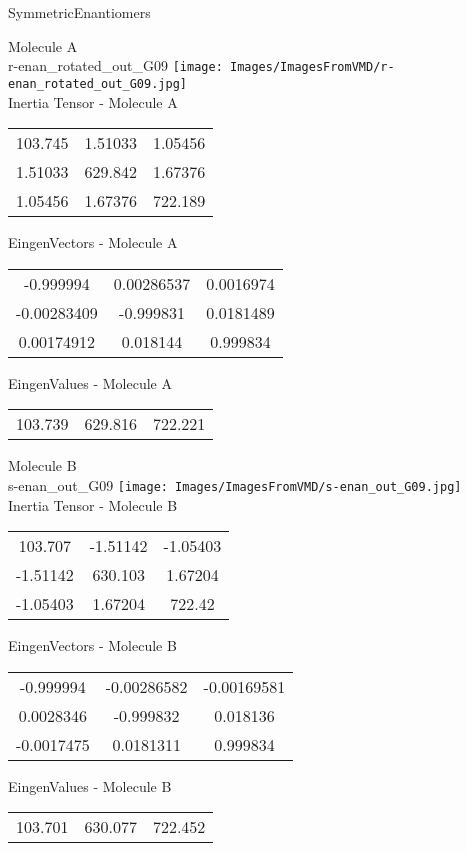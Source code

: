 \vtab[-2cm]
\begin{center}
{\large SymmetricEnantiomers}
\end{center}
\begin{multicols}{2}
\begin{center}
Molecule A \\ 
r-enan\_rotated\_out\_G09
\texttt{[image: Images/ImagesFromVMD/r-enan\_rotated\_out\_G09.jpg]}
\\
Inertia Tensor - Molecule A \\
\vtab
\begin{tabular}{|c c c|}
103.745	 & 	1.51033	 & 	1.05456	 \\
1.51033	 & 	629.842	 & 	1.67376	 \\
1.05456	 & 	1.67376	 & 	722.189
\end{tabular}

\vtab
 EingenVectors - Molecule A     \\
\vtab
\begin{tabular}{|c c c|}
-0.999994	 & 	0.00286537	 & 	0.0016974	 \\
-0.00283409	 & 	-0.999831	 & 	0.0181489	 \\
0.00174912	 & 	0.018144	 & 	0.999834
\end{tabular}

\vtab
 EingenValues - Molecule A     \\
\vtab
\begin{tabular}{|c c c|}
103.739	 & 	629.816	 & 	722.221
\end{tabular}
\columnbreak

Molecule B \\ 
s-enan\_out\_G09
\texttt{[image: Images/ImagesFromVMD/s-enan\_out\_G09.jpg]}
\\
Inertia Tensor - Molecule B \\
\vtab
\begin{tabular}{|c c c|}
103.707	 & 	-1.51142	 & 	-1.05403	 \\
-1.51142	 & 	630.103	 & 	1.67204	 \\
-1.05403	 & 	1.67204	 & 	722.42
\end{tabular}

\vtab
 EingenVectors - Molecule B     \\
\vtab
\begin{tabular}{|c c c|}
-0.999994	 & 	-0.00286582	 & 	-0.00169581	 \\
0.0028346	 & 	-0.999832	 & 	0.018136	 \\
-0.0017475	 & 	0.0181311	 & 	0.999834
\end{tabular}

\vtab
 EingenValues - Molecule B     \\
\vtab
\begin{tabular}{|c c c|}
103.701	 & 	630.077	 & 	722.452
\end{tabular}

\end{center}
\end{multicols}
